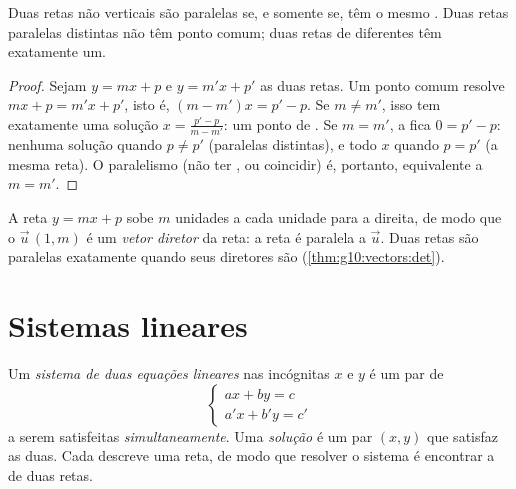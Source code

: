 \begin{proposition}\label{prop:g10:lines:parallel}
Duas retas não verticais são paralelas se, e somente se, têm o mesmo
. Duas retas paralelas distintas não têm ponto comum;
duas retas de  diferentes têm exatamente um.
\end{proposition}

\begin{proof}
Sejam $y = mx + p$ e $y = m'x + p'$ as duas retas. Um ponto comum
resolve $mx + p = m'x + p'$, isto é, $(m - m')x = p' - p$. Se
$m \neq m'$, isso tem exatamente uma solução
$x = \frac{p' - p}{m - m'}$: um ponto de . Se $m = m'$, a
 fica $0 = p' - p$: nenhuma solução quando $p \neq p'$ (paralelas
distintas), e todo $x$ quando $p = p'$ (a mesma reta). O paralelismo (não
ter , ou coincidir) é, portanto, equivalente a $m = m'$.
\end{proof}

\begin{remark}
A reta $y = mx + p$ sobe $m$ unidades a cada unidade para a direita, de
modo que o  $\vec u\,(1, m)$ é um \emph{vetor diretor} da reta: a reta é paralela a $\vec u$. Duas retas são paralelas
exatamente quando seus  diretores são 
(\cref{thm:g10:vectors:det}).
\end{remark}

\section{Sistemas lineares}

\begin{definition}\label{def:g10:lines:system}
Um \emph{sistema de duas equações lineares} nas
incógnitas $x$ e $y$ é um par de 
\[
\begin{cases}
a x + b y = c \\
a' x + b' y = c'
\end{cases}
\]
a serem satisfeitas \emph{simultaneamente}. Uma \emph{solução} é um par
$(x, y)$ que satisfaz as duas. Cada  descreve uma reta, de modo
que resolver o sistema é encontrar a  de duas retas.
\end{definition}


